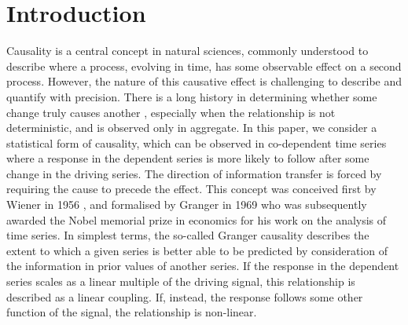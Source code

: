 \documentclass[]{rsos}%
\begin{document}


\maketitle


\section{Introduction}

  Causality is a central concept in natural sciences, commonly understood to describe where a process, evolving in time, has some observable effect on a second process. However, the nature of this causative effect is challenging to describe and quantify with precision. There is a long history in determining whether some change truly causes another \cite{hume1738treatise,pearl2009causality}, especially when the relationship is not deterministic, and is observed only in aggregate. In this paper, we consider a statistical form of causality, which can be observed in co-dependent time series where a response in the dependent series is more likely to follow after some change in the driving series. The direction of information transfer is forced by requiring the cause to precede the effect. This concept was conceived first by Wiener in 1956 \cite{Wiener}, and formalised by Granger in 1969 \cite{granger1969investigating} who was subsequently awarded the Nobel memorial prize in economics for his work on the analysis of time series. In simplest terms, the so-called Granger causality describes the extent to which a given series is better able to be predicted by consideration of the information in prior values of another series. If the response in the dependent series scales as a linear multiple of the driving signal, this relationship is described as a linear coupling. If, instead, the response follows some other function of the signal, the relationship is non-linear.
\end{document}
